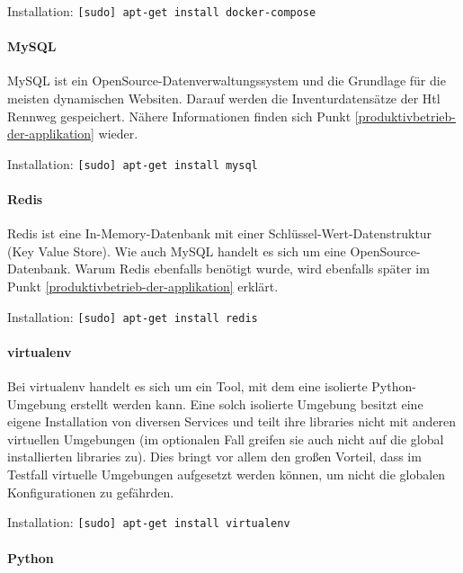Installation: \texttt{{[}sudo{]}\ apt-get\ install\ docker-compose}

\hypertarget{mysql}{%
\paragraph{MySQL}\label{mysql}}

MySQL ist ein OpenSource-Datenverwaltungssystem und die Grundlage für
die meisten dynamischen Websiten. Darauf werden die Inventurdatensätze
der Htl Rennweg gespeichert. Nähere Informationen finden sich Punkt
\ref{produktivbetrieb-der-applikation} wieder.

Installation: \texttt{{[}sudo{]}\ apt-get\ install\ mysql}

\hypertarget{redis}{%
\paragraph{Redis}\label{redis}}

Redis ist eine In-Memory-Datenbank mit einer
Schlüssel-Wert-Datenstruktur (Key Value Store). Wie auch MySQL handelt
es sich um eine OpenSource-Datenbank. Warum Redis ebenfalls benötigt
wurde, wird ebenfalls später im Punkt
\ref{produktivbetrieb-der-applikation} erklärt.

Installation: \texttt{{[}sudo{]}\ apt-get\ install\ redis}

\hypertarget{virtualenv}{%
\paragraph{virtualenv}\label{virtualenv}}

Bei virtualenv handelt es sich um ein Tool, mit dem eine isolierte
Python-Umgebung erstellt werden kann. Eine solch isolierte Umgebung
besitzt eine eigene Installation von diversen Services und teilt ihre
libraries nicht mit anderen virtuellen Umgebungen (im optionalen Fall
greifen sie auch nicht auf die global installierten libraries zu). Dies
bringt vor allem den großen Vorteil, dass im Testfall virtuelle
Umgebungen aufgesetzt werden können, um nicht die globalen
Konfigurationen zu gefährden.

Installation: \texttt{{[}sudo{]}\ apt-get\ install\ virtualenv}

\hypertarget{python}{%
\paragraph{Python}\label{python}}

